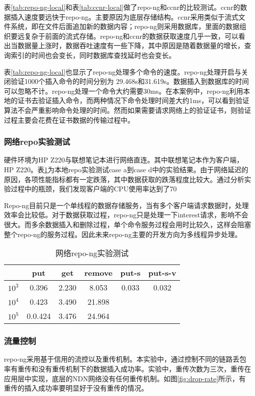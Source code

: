 表\ref{tab:repo-ng-local}和表\ref{tab:ccnr-local}做了repo-ng和ccnr的比较测试。ccnr的数据插入速度要远快于repo-ng。主要原因为底层存储结构。ccnr采用类似于流式文件系统，即在文件后面追加新的数据内容；repo-ng则采用数据库，里面的数据组织要远复杂于前面的流式存储。repo-ng和ccnr的数据获取速度几乎一致，可以看出当数据量上涨时，数据吞吐速度有一些下降，其中原因是随着数据量的增长，查询索引的时间也会变长，同时数据库查找延时也会变长。

表\ref{tab:repo-ng-local}也显示了repo-ng处理多个命令的速度。repo-ng处理开启与关闭验证1000个插入命令的时间分别为 29.468s和31.619s。数据插入到数据库的时间可以忽略不计。repo-ng处理一个命令大约需要30ms。在本案例中，repo-ng利用本地的证书去验证插入命令，而两种情况下命令处理时间差大约1ms，可以看到验证算法不会严重影响命令处理的时间。然而如果需要请求网络上的验证证书，则验证过程主要会花费在证书数据的传输过程中。

\subsubsection{网络repo实验测试}
硬件环境为HP Z220与联想笔记本进行网络直连。其中联想笔记本作为客户端，HP Z220。表\ref{tab:repo-ng-network}为本地repo实验测试case a到case d中的实验结果。由于网络延迟的原因，各项性能指标都有一定跌落，其中数据获取的跌落程度比较大。通过分析实验过程中的瓶颈，我们发现客户端的CPU使用率达到了70%

Repo-ng目前只是一个单线程的数据存储服务，当有多个客户端请求数据时，处理效率会比较低。对于数据获取过程，repo-ng只是处理一下interest请求，影响不会很大。而多余数据插入和删除过程，单个命令服务过程会用时比较久，这样会阻塞整个repo-ng的服务过程。因此未来repo-ng主要的开发方向为多线程异步处理。

\begin{table}
\centering
\caption{网络repo-ng实验测试}
\label{tab:repo-ng-network}
\begin{tabular}{ | c | c | c | c | c | c | }
    \hline
           & put & get & remove & put-s & put-s-v \\ \hline
    $10^3$ & 0.396 & 2.230 & 8.053 & 0.033 & 0.032  \\ \hline
    $10^4$ & 0.423 & 3.490 & 21.898 & & \\ \hline
    $10^5$ & 0.0.424 & 3.476 & 24.964 & & \\ \hline
\end{tabular}
\end{table}

\subsubsection{流量控制}
repo-ng采用基于信用的流控以及重传机制。本实验中，通过控制不同的链路丢包率有重传和没有重传机制下的数据插入成功率。实验中，重传次数为三次，重传在应用层中实现，底层的NDN网络没有任何重传机制。如图\ref{fig:drop-rate}所示，有重传的插入成功率要明显好于没有重传的情况。


